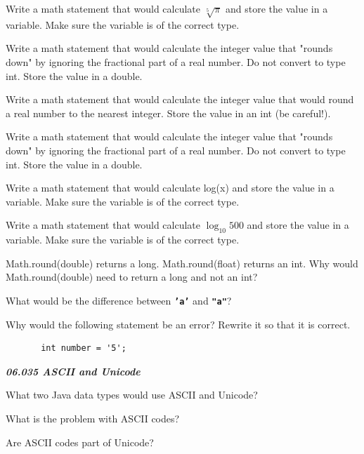 \documentclass[letterpaper,11pt]{exam}
\newcommand{\videoheading}[1]{\Large\textbf{\textit{#1}}}
\begin{document}
\begin{questions}
\question Write a math statement that would calculate $\sqrt[5]{\pi}$ and store the value in a variable.  Make sure the variable is of the correct type.
\vspace{1cm}

\question Write a math statement that would calculate the integer value that "rounds down" by ignoring the fractional part of a real number.  Do not convert to type int.  Store the value in a double.  
\vspace{1cm}

\question Write a math statement that would calculate the integer value that would round a real number to the nearest integer.  Store the value in an int (be careful!).  
\vspace{1cm}


\question Write a math statement that would calculate the integer value that "rounds down" by ignoring the fractional part of a real number.  Do not convert to type int.  Store the value in a double.  
\vspace{1cm}


\question Write a math statement that would calculate log(x) and store the value in a variable.  Make sure the variable is of the correct type.
\vspace{1cm}

\question Write a math statement that would calculate $\log_{10}{500}$ and store the value in a variable.  Make sure the variable is of the correct type.
\vspace{1cm}

\question Math.round(double) returns a long.  Math.round(float) returns an int.  Why would Math.round(double) need to return a long and not an int?
\vspace{1cm}

\question What would be the difference between \texttt{\textbf{'a'}} and \texttt{\textbf{"a"}}?
\vspace{1cm}

\question Why would the following statement be an error?  Rewrite it so that it is correct.
\begin{verbatim}
       int number = '5';
\end{verbatim}

\videoheading{06.035 ASCII and Unicode}

\question What two Java data types would use ASCII and Unicode?

\question What is the problem with ASCII codes?

\question Are ASCII codes part of Unicode?


\end{questions}
\end{document}
